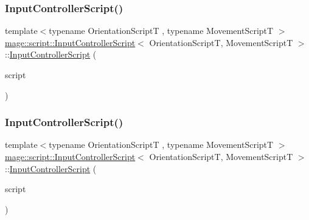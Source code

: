 \subsubsection{\texorpdfstring{Input\+Controller\+Script()}{InputControllerScript()}\hspace{0.1cm}{\footnotesize\ttfamily [2/3]}}
{\footnotesize\ttfamily template$<$typename Orientation\+ScriptT , typename Movement\+ScriptT $>$ \\
\hyperlink{classmage_1_1script_1_1_input_controller_script}{mage\+::script\+::\+Input\+Controller\+Script}$<$ Orientation\+ScriptT, Movement\+ScriptT $>$\+::\hyperlink{classmage_1_1script_1_1_input_controller_script}{Input\+Controller\+Script} (\begin{DoxyParamCaption}\item[{const \hyperlink{classmage_1_1script_1_1_input_controller_script}{Input\+Controller\+Script}$<$ Orientation\+ScriptT, Movement\+ScriptT $>$ \&}]{script }\end{DoxyParamCaption})\hspace{0.3cm}{\ttfamily [delete]}}

\hypertarget{classmage_1_1script_1_1_input_controller_script_a3726d5057dbdbc6193e3879951717255}{}\label{classmage_1_1script_1_1_input_controller_script_a3726d5057dbdbc6193e3879951717255} 
\subsubsection{\texorpdfstring{Input\+Controller\+Script()}{InputControllerScript()}\hspace{0.1cm}{\footnotesize\ttfamily [3/3]}}
{\footnotesize\ttfamily template$<$typename Orientation\+ScriptT , typename Movement\+ScriptT $>$ \\
\hyperlink{classmage_1_1script_1_1_input_controller_script}{mage\+::script\+::\+Input\+Controller\+Script}$<$ Orientation\+ScriptT, Movement\+ScriptT $>$\+::\hyperlink{classmage_1_1script_1_1_input_controller_script}{Input\+Controller\+Script} (\begin{DoxyParamCaption}\item[{\hyperlink{classmage_1_1script_1_1_input_controller_script}{Input\+Controller\+Script}$<$ Orientation\+ScriptT, Movement\+ScriptT $>$ \&\&}]{script }\end{DoxyParamCaption})}

